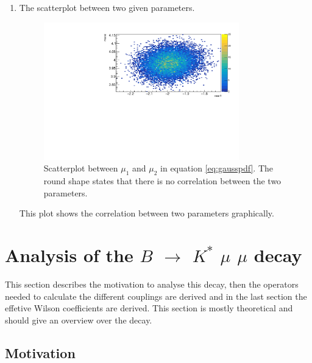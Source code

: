\documentclass[english]{uzhpub}
\begin{document}
\begin{enumerate}
  \item The scatterplot between two given parameters.
  \begin{figure}[H]
    \centering
    \includegraphics[width=0.8\textwidth]{RooMCMC/scatter}
    \caption{Scatterplot between $\mu_1$ and $\mu_2$ in equation \ref{eq:gausspdf}. The round shape states that there is no correlation between the two parameters.}
    \label{fig:scatter}
  \end{figure}
  This plot shows the correlation between two parameters graphically.
\end{enumerate}


\section{Analysis of the $B$ $\rightarrow$ $K^{*}$ $\mu$ $\mu$ decay}

This section describes the motivation to analyse this decay, then the operators needed to calculate the different couplings are derived and in the last section the effetive Wilson coefficients are derived. This section is mostly theoretical and should give an overview over the decay.

\subsection{Motivation} \label{sec:Motivation}
\end{document}

